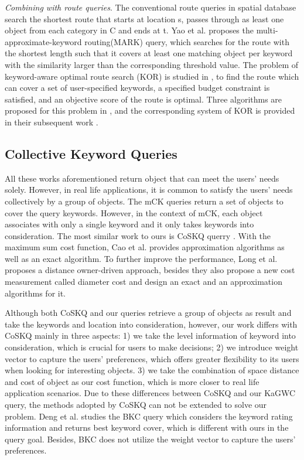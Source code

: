 \textit{Combining with route queries}. The conventional route queries \cite{li2005trip} in spatial database search the shortest route that starts at location s, passes through as least one object from each category in C and ends at t. Yao et al. \cite{yao2011multi} proposes the multi-approximate-keyword routing(MARK) query, which searches for the route with the shortest length such that it covers at least one matching object per keyword with the similarity larger than the corresponding threshold value. The problem of keyword-aware optimal route search (KOR) is studied in \cite{cao2012keyword}, to find the route which can cover a set of user-specified keywords, a specified budget constraint is satisfied, and an objective score of the route is optimal. Three algorithms are proposed for this problem in \cite{cao2012keyword}, and the corresponding system of KOR is provided in their subsequent work \cite{cao2013kors}.

\subsection{Collective Keyword Queries}
All these works aforementioned return object that can meet the users' needs solely. However, in real life applications, it is common to satisfy the users' needs collectively by a group of objects. The mCK queries \cite{zhang2009keyword, zhang2010locating} return a set of objects to cover the query keywords. However, in the context of mCK, each object associates with only a single keyword and it only takes keywords into consideration. The most similar work to ours is CoSKQ querry \cite{cao2011collective, long2013collective}. With the maximum sum cost function, Cao et al. \cite{cao2011collective} provides approximation algorithms as well as an exact algorithm. To further improve the performance, Long et al. \cite{long2013collective} proposes a distance owner-driven approach, besides they also propose a new cost measurement called diameter cost and design an exact and an approximation algorithms for it.

Although both CoSKQ and our queries retrieve a group of objects as result and take the keywords and location into consideration, however, our work differs with CoSKQ mainly in three aspects: 1) we take the level information of keyword into consideration, which is  crucial for users to make decisions; 2) we introduce weight vector to capture the users' preferences, which offers greater flexibility to its users when looking for interesting objects. 3) we take the combination of space distance and cost of object as our cost function, which is more closer to real life application scenarios. Due to these differences between CoSKQ and our KaGWC query, the methods adopted by CoSKQ can not be extended to solve our problem. Deng et al. \cite{deng2015best} studies the BKC query which considers the keyword rating information and returns best keyword cover, which is different with ours in the query goal. Besides, BKC does not utilize the weight vector to capture the users' preferences.
